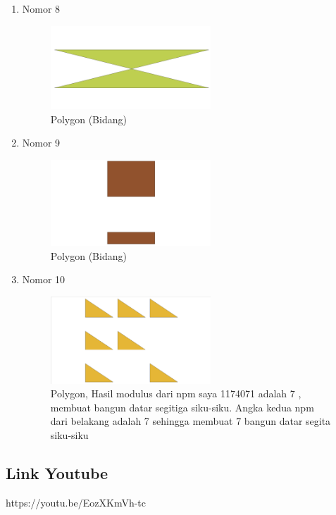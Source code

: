 \begin{enumerate}
\begin{figure}[H]
	\end{figure}
	\item Nomor 8
	
	\begin{figure}[H]
		\includegraphics[width=6cm]{figures/Tugas2/1174071/soal8.png}
		\centering
		\caption{Polygon (Bidang)}
	\end{figure}
	\item Nomor 9
	
	\begin{figure}[H]
		\includegraphics[width=6cm]{figures/Tugas2/1174071/soal9.png}
		\centering
		\caption{Polygon (Bidang)}
	\end{figure}
	\item Nomor 10
	
	\begin{figure}[H]
		\includegraphics[width=6cm]{figures/Tugas2/1174071/soal10.png}
		\centering
		\caption{Polygon, Hasil modulus dari npm saya 1174071 adalah 7 ,  membuat bangun datar segitiga siku-siku. Angka kedua npm dari belakang adalah 7 sehingga membuat 7 bangun datar segita siku-siku}
	\end{figure}
\end{enumerate}
\subsection{Link Youtube}
https://youtu.be/EozXKmVh-tc